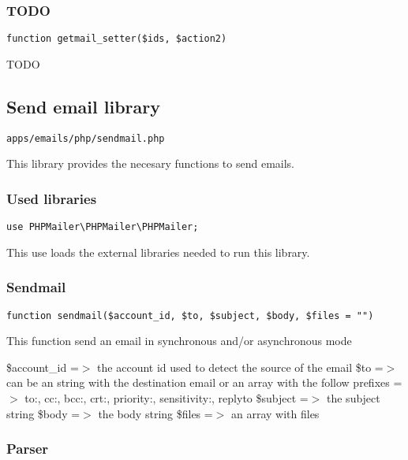 \documentclass[a4paper]{article}
\begin{document}
\hypertarget{toc64}{}
\subsubsection{TODO}

\begin{lstlisting}
function getmail_setter($ids, $action2)
\end{lstlisting}

TODO

\hypertarget{toc65}{}
\subsection{Send email library}

\begin{lstlisting}
apps/emails/php/sendmail.php
\end{lstlisting}

This library provides the necesary functions to send emails.

\hypertarget{toc66}{}
\subsubsection{Used libraries}

\begin{lstlisting}
use PHPMailer\PHPMailer\PHPMailer;
\end{lstlisting}

This use loads the external libraries needed to run this library.

\hypertarget{toc67}{}
\subsubsection{Sendmail}

\begin{lstlisting}
function sendmail($account_id, $to, $subject, $body, $files = "")
\end{lstlisting}

This function send an email in synchronous and/or asynchronous mode

\$account\_id =$>$ the account id used to detect the source of the email
\$to         =$>$ can be an string with the destination email or an array with
               the follow prefixes =$>$ to:, cc:, bcc:, crt:, priority:,
               sensitivity:, replyto
\$subject    =$>$ the subject string
\$body       =$>$ the body string
\$files      =$>$ an array with files

\hypertarget{toc68}{}
\subsubsection{Parser}
\end{document}
